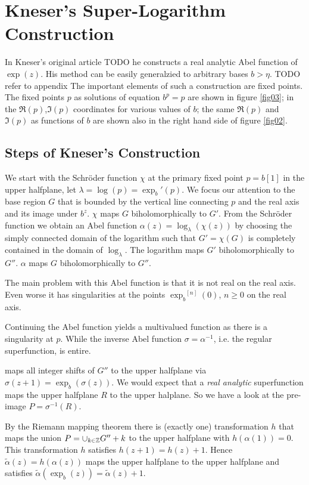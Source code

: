 \documentclass{article}
\numberwithin{equation}{section}
\begin{document}
\section{Kneser's Super-Logarithm Construction}\label{sec:Kneser}
In Kneser's original article TODO he constructs a real analytic Abel
function of $\exp(z)$. His method can be easily generalzied to
arbitrary bases $b>\eta$. 
TODO refer to appendix
The important elements of such a construction are fixed points.
The fixed points $p$ as solutions of equation $b^p=p$ are shown in figure \ref{fig03};
in the $\Re(p)$,$\Im(p)$ coordinates for various values of $b$; the same
$\Re(p)$ and $\Im(p)$ as functions of $b$ are shown also in the right hand side of figure 
\ref{fig02}.

\subsection{Steps of Kneser's Construction}
We start with the Schröder function $\chi$ at the primary fixed point
$p=b[1]$ in the upper halfplane, let
$\lambda=\log(p)={\exp_b}'(p)$. We focus our attention to the
base region $G$ that is bounded by the vertical line
connecting $p$ and the real axis and its image under $b^z$.
$\chi$ maps $G$ biholomorphically to $G'$.
From the Schröder function we
obtain an Abel function $\alpha(z)=\log_\lambda(\chi(z))$ by choosing the
simply connected domain of the logarithm such that $G'=\chi(G)$ is
completely contained in the domain of $\log_\lambda$. The logarithm maps
$G'$ biholomorphically to $G''$. $\alpha$ maps $G$ biholomorphically
to $G''$.

The main problem with this Abel function is that it is not real on the
real axis. Even worse it has singularities at the points
${\exp_b}^{[n]}(0)$, $n\ge 0$ on the real axis. 

Continuing the Abel function yields a multivalued function as there is
a singularity at $p$. While the inverse Abel
function $\sigma=\alpha^{-1}$, i.e. the regular superfunction, is entire.


 maps all integer shifts of
$G''$ to the upper halfplane via
$\sigma(z+1)=\exp_b(\sigma(z))$. We would expect that a {\em
  real analytic} superfunction maps the upper halfplane $R$ to the upper
halplane. So we have a look at the pre-image $P=\sigma^{-1}(R)$.


By the Riemann mapping theorem there is 
(exactly one) transformation $h$ that maps the union $P=\cup_{k\in\mathbb{Z}}
G''+k$ to the upper halfplane with $h(\alpha(1))=0$. This
transformation $h$ satisfies $h(z+1)=h(z)+1$. Hence
$\tilde{\alpha}(z)=h(\alpha(z))$ maps the upper halfplane to the upper
halfplane and satisfies
$\tilde{\alpha}(\exp_b(z))=\tilde{\alpha}(z)+1$.
\end{document}
